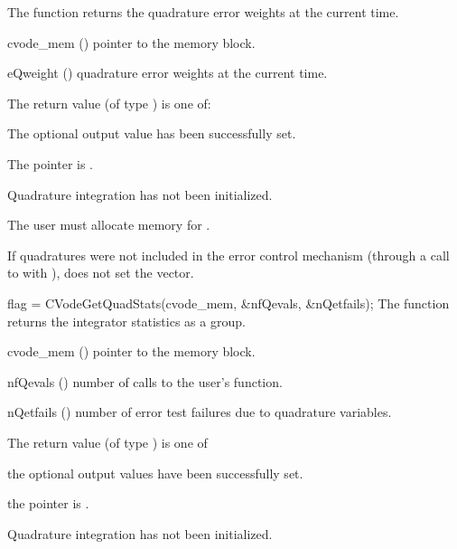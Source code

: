 {
  The function  returns the quadrature error weights 
  at the current time.
}
{
  \begin{args}
  \item[cvode\_mem] ()
    pointer to the {\cvodes} memory block.
  \item[eQweight] ()
    quadrature error weights at the current time.
  \end{args}
}
{
  The return value  (of type ) is one of:
  \begin{args}
  \item[\Id{CV\_SUCCESS}] 
    The optional output value has been successfully set.
  \item[\Id{CV\_MEM\_NULL}]
    The  pointer is .
  \item[\Id{CV\_NO\_QUAD}]
    Quadrature integration has not been initialized.
  \end{args}
}
{
  {\warn}The user must allocate memory for .

  If quadratures were not included in the error control mechanism (through a 
  call to  with ), 
   does not set the  vector.
}
{
  flag = CVodeGetQuadStats(cvode\_mem, \&nfQevals, \&nQetfails);
}
{
  The function  returns the {\cvodes} integrator statistics
  as a group.
}
{
  \begin{args}
  \item[cvode\_mem] ()
    pointer to the {\cvodes} memory block.
  \item[nfQevals] ()
    number of calls to the user's  function.
  \item[nQetfails] ()
    number of error test failures due to quadrature variables.
  \end{args}
}
{
  The return value  (of type ) is one of
  \begin{args}
  \item[\Id{CV\_SUCCESS}] 
    the optional output values have been successfully set.
  \item[\Id{CV\_MEM\_NULL}]
    the  pointer is .
  \item[\Id{CV\_NO\_QUAD}]
    Quadrature integration has not been initialized.
  \end{args}
}
{}

